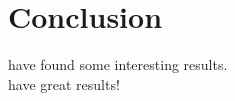 \documentclass{article} %
\begin{document}
\section{Conclusion}



\cite{Konar:2013aa} have found some interesting results.          %
\\
\cite{doi:10.1108/01439910310457706} have great results!       %



\end{document}
